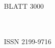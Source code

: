 \documentclass{article}
\newcommand{\blatt}{BLATT 3000}
\newcommand*{\Fatness}{
  \usefont{\encodingdefault}{\sfdefault}{b}{n}
  \fontsize{50}{0}
  \selectfont
}
\begin{document}
  \begin{center}

    {\Fatness{\blatt}}

    \begin{minipage}[t]{1.0\textwidth}
      \begingroup
      \parfillskip=0pt

      \begin{minipage}[t]{0.57\textwidth}

        \begin{flushleft} \small
          \listofauthors
        \end{flushleft}

      \end{minipage}%
      \hfill
      \begin{minipage}[t]{0.4\textwidth}

        \begin{flushright} \small
          \listofsubtitles
        \end{flushright}

      \end{minipage}%
      \par\endgroup
    \end{minipage}

    \vfill

    {\normalfont\small \blattReleaseId \\ \blattReleaseDate \\ ISSN 2199-9716}

  \end{center}
\end{document}

